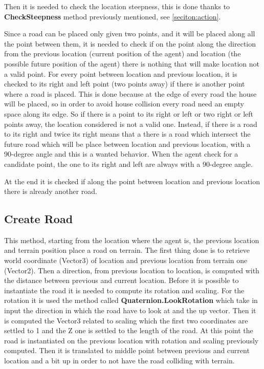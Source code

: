 \documentclass[12pt]{article}
\begin{document}
    Then it is needed to check the location steepness, this is done thanks to \textbf{CheckSteepness} method previously mentioned, see \ref{seciton:action}.

    Since a road can be placed only given two points, and it will be placed along all the point between them, it is needed to check if on the point along the direction
    from the previous location (current position of the agent) and location (the possible future position of the agent) there is nothing that will make location not 
    a valid point. For every point between location and previous location, it is checked to its right and left point (two points away) if there is another point where
    a road is placed. This is done because at the edge of every road the house will be placed, so in order to avoid house collision every road need an empty space along
    its edge. So if there is a point to its right or left or two right or left points away, the location considered is not a valid one. Instead, if there is a road to
    its right and twice its right means that a there is a road which intersect the future road which will be place between location and previous location, with a 
    90-degree angle and this is a wanted behavior. When the agent check for a candidate point, the one to its right and left are always with a 90-degree angle.
    
    At the end it is checked if along the point between location and previous location there is already another road.

    \subsection{Create Road} \label{section:CreateRoad}
    This method, starting from the location where the agent is, the previous location and terrain position place a road on terrain. The first thing done is to retrieve 
    world coordinate (Vector3) of location and previous location from terrain one (Vector2). Then a direction, from previous location to location, is computed with the distance
    between previous and current location. Before it is possible to instantiate the road it is needed to compute its rotation and scaling. For the rotation it is used the 
    method called \textbf{Quaternion.LookRotation} which take in input the direction in which the road have to look at and the up vector. Then it is computed the Vector3
    related to scaling which the first two coordinates are settled to 1 and the Z one is settled to the length of the road. At this point the road is instantiated on the previous
    location with rotation and scaling previously computed. Then it is translated to middle point between previous and current location and a bit up in order to not have the 
    road colliding with terrain.
\end{document}
